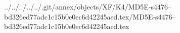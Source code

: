 ../../../../../.git/annex/objects/XF/K4/MD5E-s4476--bd326ed77adc1c15b0e0ec6d42245aed.tex/MD5E-s4476--bd326ed77adc1c15b0e0ec6d42245aed.tex